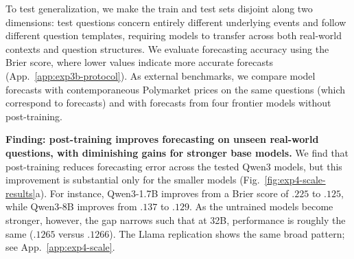 \documentclass{article}
\begin{document}
To test generalization, we make the train and test sets disjoint along two dimensions: test questions concern entirely different underlying events and follow different question templates, requiring models to transfer across both real-world contexts and question structures. We evaluate forecasting accuracy using the Brier score, where lower values indicate more accurate forecasts (App.~\ref{app:exp3b-protocol}). As external benchmarks, we compare model forecasts with contemporaneous Polymarket prices on the same questions (which correspond to forecasts) and with forecasts from four frontier models without post-training.


\noindent\textbf{Finding: post-training improves forecasting on unseen real-world questions, with diminishing gains for stronger base models.}
We find that post-training reduces forecasting error across the tested Qwen3 models, but this improvement is substantial only for the smaller models (Fig.~\ref{fig:exp4-scale-results}a). For instance, Qwen3-1.7B improves from a Brier score of $.225$ to $.125$, while Qwen3-8B improves from $.137$ to $.129$.
As the untrained models become stronger, however, the gap narrows such that at 32B, performance is roughly the same ($.1265$ versus $.1266$).
The Llama replication shows the same broad pattern; see App.~\ref{app:exp4-scale}.
\end{document}
